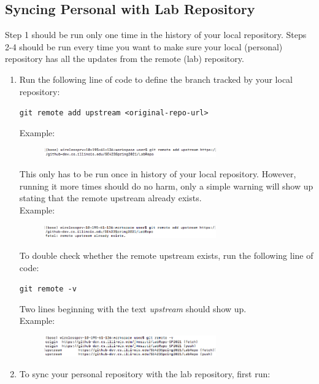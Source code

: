 \documentclass{article}
\begin{document}
\subsection{Syncing Personal with Lab Repository}
Step 1 should be run only one time in the history of your local repository. Steps 2-4 should be run every time you want to make sure your local (personal) repository has all the updates from the remote (lab) repository.
\begin{enumerate}
  \item Run the following line of code to define the branch tracked by your local repository:
  \begin{center}
      \verb|git remote add upstream <original-repo-url>|
  \end{center}
  Example: 
  \begin{figure}[H]
    \centering
    \includegraphics[width = 0.7\textwidth]{Git_Step1a.png} 
  \end{figure}
  This only has to be run once in history of your local repository. However, running it more times should do no harm, only a simple warning will show up stating that the remote upstream already exists. \\ Example: 
  \begin{figure}[H]
    \centering
    \includegraphics[width = 0.7\textwidth]{Git_Step1b.png} 
  \end{figure}
  To double check whether the remote upstream exists, run the following line of code:
    \begin{center}
      \verb|git remote -v|
  \end{center}
  Two lines beginning with the text \textit{upstream} should show up. \\ Example: 
  \begin{figure}[H]
    \centering
    \includegraphics[width = 0.7\textwidth]{Git_Step1c.png} 
  \end{figure}
  \item To sync your personal repository with the lab repository, first run:

\end{enumerate}
\end{document}
